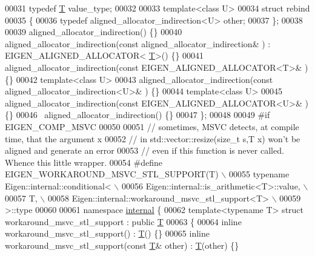 \begin{DoxyCode}
00031     \textcolor{keyword}{typedef} \hyperlink{group___sparse_core___module_class_eigen_1_1_triplet}{T}               value\_type;
00032 
00033     \textcolor{keyword}{template}<\textcolor{keyword}{class} U>
00034     \textcolor{keyword}{struct }rebind
00035     \{
00036       \textcolor{keyword}{typedef} aligned\_allocator\_indirection<U> other;
00037     \};
00038 
00039     aligned\_allocator\_indirection() \{\}
00040     aligned\_allocator\_indirection(\textcolor{keyword}{const} aligned\_allocator\_indirection& ) : EIGEN\_ALIGNED\_ALLOCATOR<
      \hyperlink{group___sparse_core___module_class_eigen_1_1_triplet}{T}>() \{\}
00041     aligned\_allocator\_indirection(\textcolor{keyword}{const} EIGEN\_ALIGNED\_ALLOCATOR<T>& ) \{\}
00042     \textcolor{keyword}{template}<\textcolor{keyword}{class} U>
00043     aligned\_allocator\_indirection(\textcolor{keyword}{const} aligned\_allocator\_indirection<U>& ) \{\}
00044     \textcolor{keyword}{template}<\textcolor{keyword}{class} U>
00045     aligned\_allocator\_indirection(\textcolor{keyword}{const} EIGEN\_ALIGNED\_ALLOCATOR<U>& ) \{\}
00046     ~aligned\_allocator\_indirection() \{\}
00047   \};
00048 
00049 \textcolor{preprocessor}{#if EIGEN\_COMP\_MSVC}
00050 
00051   \textcolor{comment}{// sometimes, MSVC detects, at compile time, that the argument x}
00052   \textcolor{comment}{// in std::vector::resize(size\_t s,T x) won't be aligned and generate an error}
00053   \textcolor{comment}{// even if this function is never called. Whence this little wrapper.}
00054 \textcolor{preprocessor}{#define EIGEN\_WORKAROUND\_MSVC\_STL\_SUPPORT(T) \(\backslash\)}
00055 \textcolor{preprocessor}{  typename Eigen::internal::conditional< \(\backslash\)}
00056 \textcolor{preprocessor}{    Eigen::internal::is\_arithmetic<T>::value, \(\backslash\)}
00057 \textcolor{preprocessor}{    T, \(\backslash\)}
00058 \textcolor{preprocessor}{    Eigen::internal::workaround\_msvc\_stl\_support<T> \(\backslash\)}
00059 \textcolor{preprocessor}{  >::type}
00060 
00061   \textcolor{keyword}{namespace }\hyperlink{namespaceinternal}{internal} \{
00062   \textcolor{keyword}{template}<\textcolor{keyword}{typename} T> \textcolor{keyword}{struct }workaround\_msvc\_stl\_support : \textcolor{keyword}{public} \hyperlink{group___sparse_core___module_class_eigen_1_1_triplet}{T}
00063   \{
00064     \textcolor{keyword}{inline} workaround\_msvc\_stl\_support() : \hyperlink{group___sparse_core___module_class_eigen_1_1_triplet}{T}() \{\}
00065     \textcolor{keyword}{inline} workaround\_msvc\_stl\_support(\textcolor{keyword}{const} \hyperlink{group___sparse_core___module_class_eigen_1_1_triplet}{T}& other) : \hyperlink{group___sparse_core___module_class_eigen_1_1_triplet}{T}(other) \{\}

\end{DoxyCode}
